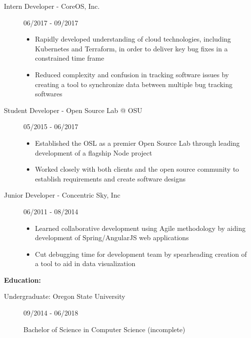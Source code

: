 \documentclass[10pt]{article}
\begin{document}
\begin{description}
\item [Intern Developer - CoreOS, Inc.]
\hfill 06/2017 - 09/2017
\begin{itemize}
\item Rapidly developed understanding of cloud technologies, including Kubernetes and Terraform, in order to deliver key bug fixes in a constrained time frame
\item Reduced complexity and confusion in tracking software issues by creating a tool to synchronize data between multiple bug tracking softwares
\end{itemize}

\item[Student Developer - Open Source Lab @ OSU]
\hfill 05/2015 - 06/2017
\begin{itemize}
\item Established the OSL as a premier Open Source Lab through leading development of a flagship Node project
\item Worked closely with both clients and the open source community to establish requirements and create software designs
\end{itemize}

\item[Junior Developer - Concentric Sky, Inc]
\hfill 06/2011 - 08/2014
\begin{itemize}
\item Learned collaborative development using Agile methodology by aiding development of Spring/AngularJS web applications
\item Cut debugging time for development team by spearheading creation of a tool to aid in data visualization
\end{itemize}
\end{description}
\smallskip
{\huge \textbf{Education:}}
\hrulefill
\begin{description}
\item[Undergraduate: Oregon State University]
\hfill 09/2014 - 06/2018

		Bachelor of Science in Computer Science (incomplete)
\end{description}
\end{document}
